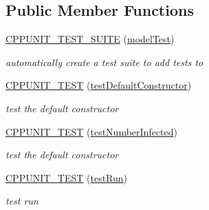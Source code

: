 \subsection*{Public Member Functions}
\begin{DoxyCompactItemize}
\item 
\mbox{\label{classmodelTest_afd8cee8035be15212f9236c2cf5b1bde}} 
\mbox{\hyperlink{classmodelTest_afd8cee8035be15212f9236c2cf5b1bde}{C\+P\+P\+U\+N\+I\+T\+\_\+\+T\+E\+S\+T\+\_\+\+S\+U\+I\+TE}} (\mbox{\hyperlink{classmodelTest}{model\+Test}})
\begin{DoxyCompactList}\small\item\em automatically create a test suite to add tests to \end{DoxyCompactList}\item 
\mbox{\label{classmodelTest_aa1691735f57c35d37d358ef56dfdc97e}} 
\mbox{\hyperlink{classmodelTest_aa1691735f57c35d37d358ef56dfdc97e}{C\+P\+P\+U\+N\+I\+T\+\_\+\+T\+E\+ST}} (\mbox{\hyperlink{classmodelTest_a1ec93676ece4bbb6f98cf65340472939}{test\+Default\+Constructor}})
\begin{DoxyCompactList}\small\item\em test the default constructor \end{DoxyCompactList}\item 
\mbox{\label{classmodelTest_ab189eb8152f72c53c6437d9e54e5a374}} 
\mbox{\hyperlink{classmodelTest_ab189eb8152f72c53c6437d9e54e5a374}{C\+P\+P\+U\+N\+I\+T\+\_\+\+T\+E\+ST}} (\mbox{\hyperlink{classmodelTest_ab7a0f9094aaab12eadc0fedbb57505e8}{test\+Number\+Infected}})
\begin{DoxyCompactList}\small\item\em test the default constructor \end{DoxyCompactList}\item 
\mbox{\label{classmodelTest_a3596a54ba85399f6d293fb928041f9a5}} 
\mbox{\hyperlink{classmodelTest_a3596a54ba85399f6d293fb928041f9a5}{C\+P\+P\+U\+N\+I\+T\+\_\+\+T\+E\+ST}} (\mbox{\hyperlink{classmodelTest_a18ccf91ea0223e52d439fa267665d718}{test\+Run}})
\begin{DoxyCompactList}\small\item\em test run \end{DoxyCompactList}\item 

\end{DoxyCompactItemize}
